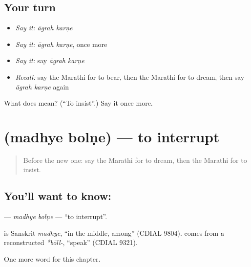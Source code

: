 \subsection*{Your turn}
\begin{itemize}
\raggedright
  \item \emph{Say it:} \emph{āgrah karṇe}
  \item \emph{Say it:} \emph{āgrah karṇe}, once more
  \item \emph{Say it:} say \emph{āgrah karṇe}
  \item \emph{Recall:} say the Marathi for to bear, then the Marathi for to dream, then say \emph{āgrah karṇe} again
\end{itemize}

\begin{tcolorbox}[breakable,colback=teal!4,colframe=teal!35!black,title={Before you move on}]
What does   mean? (\textquotedblleft{}To insist\textquotedblright{}.) Say it once more.
\end{tcolorbox}
\section[\texorpdfstring{\mr{मध्ये} \mr{बोलणे} (madhye bolṇe)}{मध्ये बोलणे (madhye bolṇe)}]{  (madhye bolṇe) — to interrupt}

\label{lesson:MR-C255-madhye-bolne}



\begin{quote}
Before the new one: say the Marathi for to dream, then the Marathi for to insist.
\end{quote}

\subsection*{You'll want to know:  }
\textbf{ } — \emph{madhye bolṇe} — \textquotedblleft{}to interrupt\textquotedblright{}.

\begin{cousinweb}
\textbf{} is Sanskrit \emph{madhye}, \textquotedblleft{}in the middle, among\textquotedblright{} (CDIAL 9804). \textbf{} comes from a reconstructed \emph{*bōll-}, \textquotedblleft{}speak\textquotedblright{} (CDIAL 9321).
\end{cousinweb}

\begin{grammarlens}[title={What you've built}]
One more word for this chapter.
\end{grammarlens}

